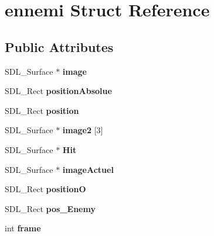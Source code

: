 \hypertarget{structennemi}{}\section{ennemi Struct Reference}
\label{structennemi}
\subsection*{Public Attributes}
\begin{DoxyCompactItemize}
\item 
S\+D\+L\+\_\+\+Surface $\ast$ {\bfseries image}\hypertarget{structennemi_a48fa2d6888159ce8134c230c0521caae}{}\label{structennemi_a48fa2d6888159ce8134c230c0521caae}

\item 
S\+D\+L\+\_\+\+Rect {\bfseries position\+Absolue}\hypertarget{structennemi_a3995a8d75541104151d70b896ddc92ca}{}\label{structennemi_a3995a8d75541104151d70b896ddc92ca}

\item 
S\+D\+L\+\_\+\+Rect {\bfseries position}\hypertarget{structennemi_a702acce6afba227591ec3662bb6f1721}{}\label{structennemi_a702acce6afba227591ec3662bb6f1721}

\item 
S\+D\+L\+\_\+\+Surface $\ast$ {\bfseries image2} \mbox{[}3\mbox{]}\hypertarget{structennemi_a2cc55e9080be200bbbd0dd00c368c7cd}{}\label{structennemi_a2cc55e9080be200bbbd0dd00c368c7cd}

\item 
S\+D\+L\+\_\+\+Surface $\ast$ {\bfseries Hit}\hypertarget{structennemi_aff233f9d47dc858073ef0ca0e8c360c1}{}\label{structennemi_aff233f9d47dc858073ef0ca0e8c360c1}

\item 
S\+D\+L\+\_\+\+Surface $\ast$ {\bfseries image\+Actuel}\hypertarget{structennemi_add354b03ac330fedd36bb342f77f11a8}{}\label{structennemi_add354b03ac330fedd36bb342f77f11a8}

\item 
S\+D\+L\+\_\+\+Rect {\bfseries positionO}\hypertarget{structennemi_a8551852dfb0c313c6d08c31bd046f414}{}\label{structennemi_a8551852dfb0c313c6d08c31bd046f414}

\item 
S\+D\+L\+\_\+\+Rect {\bfseries pos\+\_\+\+Enemy}\hypertarget{structennemi_a9f039b1c5ef1d24153f88b64e3ca82ae}{}\label{structennemi_a9f039b1c5ef1d24153f88b64e3ca82ae}

\item 
int {\bfseries frame}\hypertarget{structennemi_a5e9a10897b1bd9a43ad8c0debc92b6f4}{}\label{structennemi_a5e9a10897b1bd9a43ad8c0debc92b6f4}


\end{DoxyCompactItemize}
